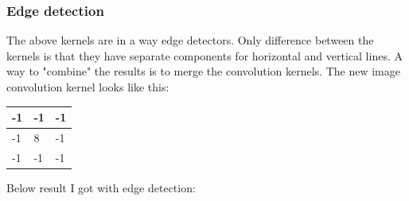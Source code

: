 \subsubsection{Edge detection}
The above kernels are in a way edge detectors. Only difference between the kernels is that they have separate components for horizontal and vertical lines. A way to "combine" the results is to merge the convolution kernels. The new image convolution kernel looks like this:
\begin{table}[!htbp]
	\centering
	\begin{tabular}{|l|l|l|}
		\hline
		-1 & -1 & -1 \\ \hline
		-1 & 8  & -1 \\ \hline
		-1 & -1 & -1 \\ \hline
	\end{tabular}
\end{table}

Below result I got with edge detection:

\begin{figure}[H]
	\centering
\end{figure}

